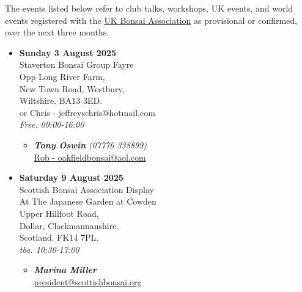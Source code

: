 \label{2025-07-events}
\noindent
The events listed below refer to club talks, workshops, UK events, and world events registered with the \href{https://www.ukbonsaiassoc.org/events.html}{UK Bonsai Association} as provisional or confirmed, over the next three months.

\begin{itemize}
    \item \textbf{Sunday 3 August 2025}
    \\
    Staverton Bonsai Group Fayre \\
    Opp Long River Farm, \\
    New Town Road, Westbury, \\
    Wiltshire. BA13 3ED. \\
    or Chris - jeffreyschris@hotmail.com
    \\
    \emph{Free. 09:00-16:00}
    \begin{itemize}
        \item \textbf{\emph{Tony Oswin}} \emph{(07776 338899)} \\
        \href{mailto:Rob - oakfieldbonsai@aol.com}{Rob - oakfieldbonsai@aol.com} 
    \end{itemize}

    \item \textbf{Saturday 9 August 2025}
    \\
    Scottish Bonsai Association Display \\
    At The Japanese Garden at Cowden \\
    Upper Hillfoot Road, \\
    Dollar, Clackmannanshire. \\
    Scotland. FK14 7PL.
    \\
    \emph{tba. 10:30-17:00}
    \begin{itemize}
        \item \textbf{\emph{Marina Miller}} \\
        \href{mailto:president@scottishbonsai.org}{president@scottishbonsai.org} 
    \end{itemize}


\end{itemize}
